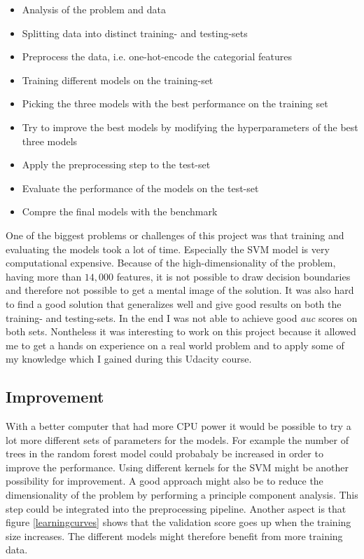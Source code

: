 \documentclass[11pt]{article}
\begin{document}
\begin{itemize}
    \item Analysis of the problem and data
    \item Splitting data into distinct training- and testing-sets
    \item Preprocess the data, i.e. one-hot-encode the categorial features
    \item Training different models on the training-set
    \item Picking the three models with the best performance on the training set
    \item Try to improve the best models by modifying the hyperparameters of the
    best three models
    \item Apply the preprocessing step to the test-set
    \item Evaluate the performance of the models on the test-set
    \item Compre the final models with the benchmark
\end{itemize}
\noindent
One of the biggest problems or challenges of this project was that training
and evaluating the models took a lot of time. Especially the SVM model is
very computational expensive. Because of the high-dimensionality of the problem,
having more than $14,000$ features, it is not possible to draw decision
boundaries and therefore not possible to get a mental image of the solution.
It was also hard to find a good solution that generalizes well and give
good results on both the training- and testing-sets. In the end I was not
able to achieve good {\it auc} scores on both sets. 
Nontheless it was interesting to work on this project
because it allowed me to get a hands on experience on a real world problem
and to apply some of my knowledge which I gained during this Udacity course.
\subsection{Improvement}

With a better computer that had more CPU power it would be possible to 
try a lot more different sets of parameters for the models.
For example the number of trees in the random forest model could probabaly 
be increased in order to improve the performance. 
Using different kernels for the SVM might be another possibility for improvement. 
A good approach might also be to reduce the dimensionality of the problem by 
performing a principle component analysis. This step could be integrated into
the preprocessing pipeline. Another aspect is that figure \ref{learningcurves} 
shows that the validation score goes up when the training size increases. 
The different models might therefore benefit from more training data. 
\end{document}
